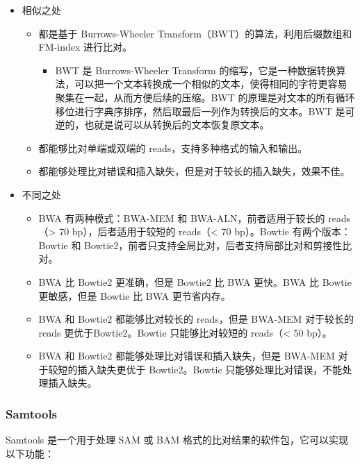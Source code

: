 \documentclass[UTF8]{ctexart}
\begin{document}
\begin{itemize}
	\item 相似之处
	\begin{itemize}
		\item 都是基于 Burrows-Wheeler Transform（BWT）的算法，利用后缀数组和 FM-index 进行比对。
		\begin{itemize}
			\item BWT 是 Burrows-Wheeler Transform 的缩写，它是一种数据转换算法，可以把一个文本转换成一个相似的文本，使得相同的字符更容易聚集在一起，从而方便后续的压缩。BWT 的原理是对文本的所有循环移位进行字典序排序，然后取最后一列作为转换后的文本。BWT 是可逆的，也就是说可以从转换后的文本恢复原文本。
		\end{itemize}
		\item 都能够比对单端或双端的 reads，支持多种格式的输入和输出。
		\item 都能够处理比对错误和插入缺失，但是对于较长的插入缺失，效果不佳。
	\end{itemize}
	\item 不同之处
	\begin{itemize}
		\item BWA 有两种模式：BWA-MEM 和 BWA-ALN，前者适用于较长的 reads（> 70 bp），后者适用于较短的 reads（< 70 bp）。Bowtie 有两个版本：Bowtie 和 Bowtie2，前者只支持全局比对，后者支持局部比对和剪接性比对。
		\item BWA 比 Bowtie2 更准确，但是 Bowtie2 比 BWA 更快。BWA 比 Bowtie 更敏感，但是 Bowtie 比 BWA 更节省内存。
		\item BWA 和 Bowtie2 都能够比对较长的 reads，但是 BWA-MEM 对于较长的 reads 更优于Bowtie2。Bowtie 只能够比对较短的 reads（< 50 bp）。
		\item BWA 和 Bowtie2 都能够处理比对错误和插入缺失，但是 BWA-MEM 对于较短的插入缺失更优于 Bowtie2。Bowtie 只能够处理比对错误，不能处理插入缺失。
	\end{itemize}
\end{itemize}

\subsubsection{Samtools}

Samtools 是一个用于处理 SAM 或 BAM 格式的比对结果的软件包，它可以实现以下功能：
\end{document}
